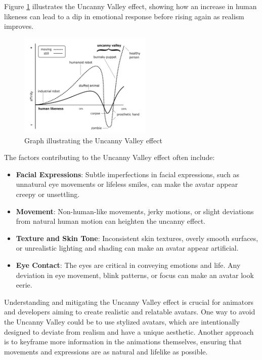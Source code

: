 \documentclass[../../main.tex]{subfiles}
\begin{document}
Figure \ref{fig:uncanny_valley_graph} illustrates the Uncanny Valley effect, showing how an increase in human likeness can lead to a dip in emotional response before rising again as realism improves.

\begin{figure}
  \centering
  \includegraphics[width = 2.5in]{chapters/background_work/images/uncanny_valley_graph.png}
  \caption{Graph illustrating the Uncanny Valley effect}
  \label{fig:uncanny_valley_graph}
\end{figure}

The factors contributing to the Uncanny Valley effect often include:

\begin{itemize}
  \item \textbf{Facial Expressions}: Subtle imperfections in facial expressions, such as unnatural eye movements or lifeless smiles, can make the avatar appear creepy or unsettling.
  \item \textbf{Movement}: Non-human-like movements, jerky motions, or slight deviations from natural human motion can heighten the uncanny effect.
  \item \textbf{Texture and Skin Tone}: Inconsistent skin textures, overly smooth surfaces, or unrealistic lighting and shading can make an avatar appear artificial.
  \item \textbf{Eye Contact}: The eyes are critical in conveying emotions and life. Any deviation in eye movement, blink patterns, or focus can make an avatar look eerie.
\end{itemize}

Understanding and mitigating the Uncanny Valley effect is crucial for animators and developers aiming to create realistic and relatable avatars. One way to avoid the Uncanny Valley could be to use stylized avatars, which are intentionally designed to deviate from realism and have a unique aesthetic. Another approach is to keyframe more information in the animations themselves, ensuring that movements and expressions are as natural and lifelike as possible.
\end{document}
